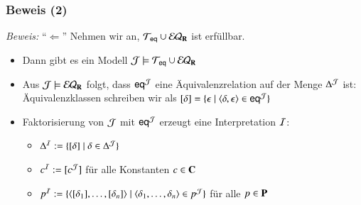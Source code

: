 \documentclass[onlymath]{beamer}
\begin{document}
\begin{frame}[t]\frametitle{Beweis (2)}


\emph{Beweis:} "`$\Leftarrow$"' Nehmen wir an, $\mathcal{T}_{\textsf{eq}}\cup\mathcal{EQ}_{\textbf{\textcolor{black}{R}}}$ ist erfüllbar.\pause
\begin{itemize}
\item Dann gibt es ein Modell $\mathcal{J}\models\mathcal{T}_{\textsf{eq}}\cup\mathcal{EQ}_{\textbf{\textcolor{black}{R}}}$\pause
\item Aus $\mathcal{J}\models\mathcal{EQ}_{\textbf{\textcolor{black}{R}}}$ folgt, dass $\textsf{eq}^{\mathcal{J}}$ eine Äquivalenzrelation auf der Menge $\Delta^{\mathcal{J}}$ ist:\\
Äquivalenzklassen schreiben wir als $[\delta]=\{\epsilon\mid \langle{\delta,\epsilon}\rangle\in\textsf{eq}^{\mathcal{J}}\}$\pause
\item Faktorisierung von $\mathcal{J}$ mit $\textsf{eq}^{\mathcal{J}}$ erzeugt eine Interpretation $\mathcal{I}$:
	\begin{itemize}
	\item $\Delta^{\mathcal{I}}\mathrel{:=}\{[\delta]\mid \delta\in\Delta^{\mathcal{J}}\}$
	\item $c^{\mathcal{I}}\mathrel{:=}[c^{\mathcal{J}}]$ für alle Konstanten $c\in\textbf{\textcolor{black}{C}}$
	\item $p^{\mathcal{I}}\mathrel{:=}\{\langle{[\delta_1],\ldots,[\delta_n]}\rangle\mid \langle{\delta_1,\ldots,\delta_n}\rangle\in p^{\mathcal{J}}\}$ für alle $p\in\textbf{\textcolor{black}{P}}$ 
	\end{itemize}

\end{itemize}


\end{frame}
\end{document}
